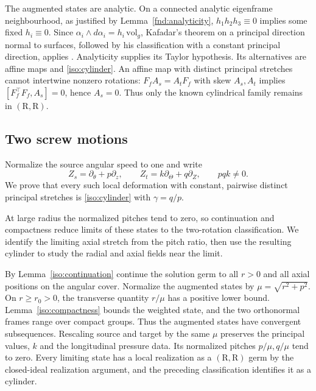 \documentclass[11pt,a4paper]{article}
\numberwithin{equation}{section}
\theoremstyle{plain}
\theoremstyle{definition}
\theoremstyle{remark}
\begin{document}
The augmented states are analytic.  On a connected analytic
eigenframe neighbourhood, as justified by Lemma~\ref{fnd:analyticity},
$h_1h_2h_3\equiv0$ implies some fixed
$h_i\equiv0$.  Since
$\alpha_i\wedge d\alpha_i=h_i\,\mathrm{vol}_g$, Kafadar's theorem on a principal direction normal to surfaces, followed by his classification with a constant principal direction,
applies \cite{Kafadar1972}.  Analyticity supplies its Taylor hypothesis.
Its alternatives are affine maps and \eqref{iso:cylinder}.
An affine map with distinct principal stretches cannot intertwine nonzero rotations:
$F_fA_s=A_tF_f$ with skew $A_s,A_t$ implies $[F_f^{\top}F_f,A_s]=0$, hence $A_s=0$.
Thus only the known cylindrical family remains in $(\mathrm{R},\mathrm{R})$.

\subsection{Two screw motions}\label{iso:two-screws}

Normalize the source angular speed to one and write
\[
 Z_s=\partial_\theta+p\partial_z,\qquad
 Z_t=k\partial_\Theta+q\partial_Z,\qquad pqk\ne0.
\]
We prove that every
such local deformation with constant, pairwise distinct principal stretches is \eqref{iso:cylinder} with $\gamma=q/p$.

At large radius the normalized pitches tend to zero, so continuation
and compactness reduce limits of these states to the two-rotation
classification. We identify the limiting axial stretch from the
pitch ratio, then use the resulting cylinder to study the radial
and axial fields near the limit.

By Lemma~\ref{iso:continuation} continue the solution germ to all $r>0$ and
all axial positions on the angular cover.  Normalize the augmented states
by $\mu=\sqrt{r^2+p^2}$.  On $r\ge r_0>0$, the transverse quantity
$r/\mu$ has a positive lower bound.  Lemma~\ref{iso:compactness} bounds the weighted state, and the two
orthonormal frames range over compact groups. Thus the augmented
states have convergent subsequences. Rescaling source and target by
the same $\mu$ preserves the principal values,
$k$ and the longitudinal pressure data.  Its normalized pitches
$p/\mu,q/\mu$ tend to zero.  Every limiting state has a local realization as a $(\mathrm{R},\mathrm{R})$ germ
by the closed-ideal realization argument, and the preceding classification
identifies it as a cylinder.
\end{document}
